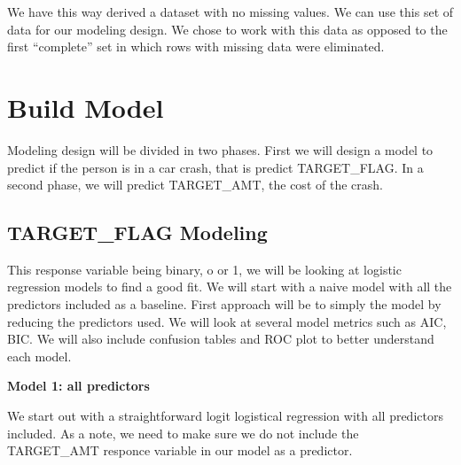 \documentclass[]{article}
\begin{document}
We have this way derived a dataset with no missing values. We can use
this set of data for our modeling design. We chose to work with this
data as opposed to the first ``complete'' set in which rows with missing
data were eliminated.

\section{Build Model}\label{build-model}

Modeling design will be divided in two phases. First we will design a
model to predict if the person is in a car crash, that is predict
TARGET\_FLAG. In a second phase, we will predict TARGET\_AMT, the cost
of the crash.

\subsection{TARGET\_FLAG Modeling}\label{target_flag-modeling}

This response variable being binary, o or 1, we will be looking at
logistic regression models to find a good fit. We will start with a
naive model with all the predictors included as a baseline. First
approach will be to simply the model by reducing the predictors used. We
will look at several model metrics such as AIC, BIC. We will also
include confusion tables and ROC plot to better understand each model.

\textbf{Model 1: all predictors}

We start out with a straightforward logit logistical regression with all
predictors included. As a note, we need to make sure we do not include
the TARGET\_AMT responce variable in our model as a predictor.
\end{document}
